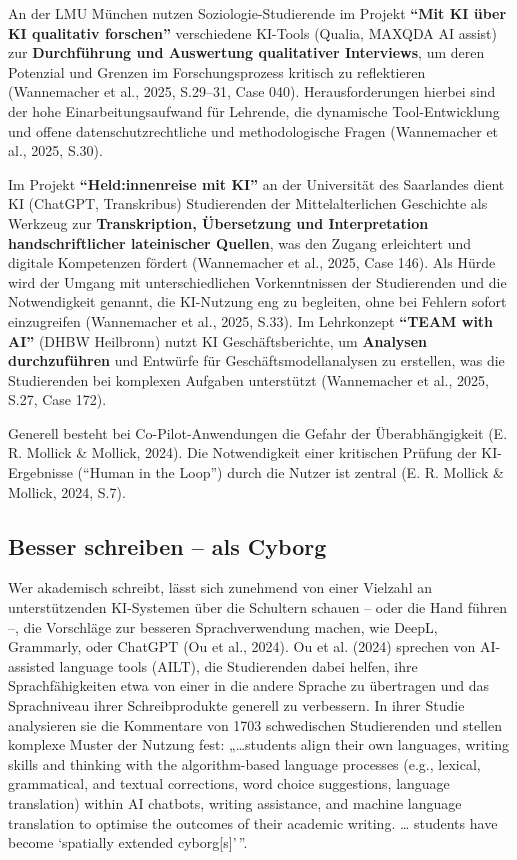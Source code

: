 \documentclass[
  ngerman,
  letterpaper,
  DIV=11]{scrreprt}
\begin{document}
An der LMU München nutzen Soziologie-Studierende im Projekt
\textbf{``Mit KI über KI qualitativ forschen''} verschiedene KI-Tools
(Qualia, MAXQDA AI assist) zur \textbf{Durchführung und Auswertung
qualitativer Interviews}, um deren Potenzial und Grenzen im
Forschungsprozess kritisch zu reflektieren (Wannemacher et al., 2025,
S.29--31, Case 040). Herausforderungen hierbei sind der hohe
Einarbeitungsaufwand für Lehrende, die dynamische Tool-Entwicklung und
offene datenschutzrechtliche und methodologische Fragen (Wannemacher et
al., 2025, S.30).

Im Projekt \textbf{``Held:innenreise mit KI''} an der Universität des
Saarlandes dient KI (ChatGPT, Transkribus) Studierenden der
Mittelalterlichen Geschichte als Werkzeug zur \textbf{Transkription,
Übersetzung und Interpretation handschriftlicher lateinischer Quellen},
was den Zugang erleichtert und digitale Kompetenzen fördert (Wannemacher
et al., 2025, Case 146). Als Hürde wird der Umgang mit unterschiedlichen
Vorkenntnissen der Studierenden und die Notwendigkeit genannt, die
KI-Nutzung eng zu begleiten, ohne bei Fehlern sofort einzugreifen
(Wannemacher et al., 2025, S.33). Im Lehrkonzept \textbf{``TEAM with
AI''} (DHBW Heilbronn) nutzt KI Geschäftsberichte, um \textbf{Analysen
durchzuführen} und Entwürfe für Geschäftsmodellanalysen zu erstellen,
was die Studierenden bei komplexen Aufgaben unterstützt (Wannemacher et
al., 2025, S.27, Case 172).

Generell besteht bei Co-Pilot-Anwendungen die Gefahr der
Überabhängigkeit (E. R. Mollick \& Mollick, 2024). Die Notwendigkeit
einer kritischen Prüfung der KI-Ergebnisse (``Human in the Loop'') durch
die Nutzer ist zentral (E. R. Mollick \& Mollick, 2024, S.7).

\subsection{Besser schreiben -- als Cyborg}\label{sec-cyborg-writing}

Wer akademisch schreibt, lässt sich zunehmend von einer Vielzahl an
unterstützenden KI-Systemen über die Schultern schauen -- oder die Hand
führen --, die Vorschläge zur besseren Sprachverwendung machen, wie
DeepL, Grammarly, oder ChatGPT (Ou et al., 2024). Ou et al. (2024)
sprechen von AI-assisted language tools (AILT), die Studierenden dabei
helfen, ihre Sprachfähigkeiten etwa von einer in die andere Sprache zu
übertragen und das Sprachniveau ihrer Schreibprodukte generell zu
verbessern. In ihrer Studie analysieren sie die Kommentare von 1703
schwedischen Studierenden und stellen komplexe Muster der Nutzung fest:
„\ldots students align their own languages, writing skills and thinking
with the algorithm-based language processes (e.g., lexical, grammatical,
and textual corrections, word choice suggestions, language translation)
within AI chatbots, writing assistance, and machine language translation
to optimise the outcomes of their academic writing. \ldots{} students
have become `spatially extended cyborg{[}s{]}'\,''.
\end{document}
